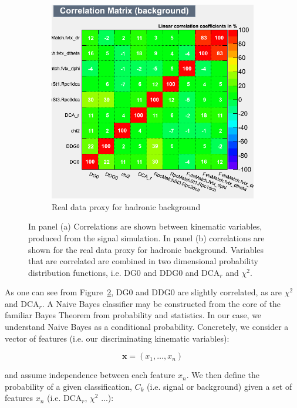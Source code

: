 \begin{figure}[H]
\begin{subfigure}[t]{0.5\textwidth}
		\includegraphics[width=0.95\linewidth]{./figures/CorrelationMatrix_Background.png}
		\caption{
      Real data proxy for hadronic background
    }
		\label{fig:corr_mat_bkg}
	\end{subfigure}
	\caption{ 
    In panel (a) Correlations are shown between kinematic variables, produced
    from the signal simulation. In panel (b) correlations are shown for the real
    data proxy for hadronic background. Variables that are correlated are
    combined in two dimensional probability distribution functions, i.e. DG0 and
    DDG0 and DCA$_r$ and $\chi^2$.
    }
	\label{fig:kinematic_var_correlations}
\end{figure}

As one can see from Figure~\ref{fig:kinematic_var_correlations}, DG0 and DDG0
are slightly correlated, as are $\chi^2$ and DCA$_r$. A Naive Bayes classifier
may be constructed from the core of the familiar Bayes Theorem from probability
and statistics. In our case, we understand Naive Bayes as a conditional
probability. Concretely, we consider a vector of features (i.e.  our
discriminating kinematic variables):

\begin{equation}
	\label{eq:feature_vector}
\mathbf{x} = (x_1, \dots, x_n)
\end{equation}

{\noindent}and assume independence between each feature $x_n$. We then define the
probability of a given classification, $C_k$ (i.e. signal or background) given a
set of features $x_n$ (i.e. DCA$_r$, $\chi^2$ ...):


